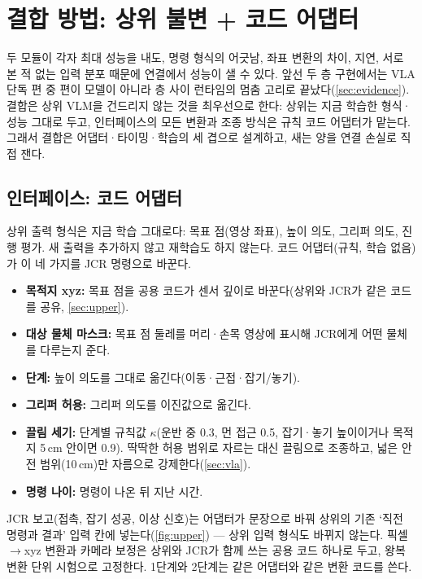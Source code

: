 \section{결합 방법: 상위 불변 + 코드 어댑터}
\label{sec:coupling}

두 모듈이 각자 최대 성능을 내도, 명령 형식의 어긋남, 좌표 변환의 차이, 지연, 서로 본 적 없는 입력 분포 때문에 연결에서 성능이 샐 수 있다. 앞선 두 층 구현에서는 VLA 단독 편 중 편이 모델이 아니라 층 사이 런타임의 멈춤 고리로 끝났다(\cref{sec:evidence}). 결합은 상위 VLM을 건드리지 않는 것을 최우선으로 한다: 상위는 지금 학습한 형식·성능 그대로 두고, 인터페이스의 모든 변환과 조종 방식은 규칙 코드 어댑터가 맡는다. 그래서 결합은 어댑터·타이밍·학습의 세 겹으로 설계하고, 새는 양을 연결 손실로 직접 잰다.

\subsection{인터페이스: 코드 어댑터}
\label{sec:adapter}
상위 출력 형식은 지금 학습 그대로다: 목표 점(영상 좌표), 높이 의도, 그리퍼 의도, 진행 평가. 새 출력을 추가하지 않고 재학습도 하지 않는다. 코드 어댑터(규칙, 학습 없음)가 이 네 가지를 JCR 명령으로 바꾼다.
\begin{itemize}
  \item \textbf{목적지 xyz:} 목표 점을 공용 코드가 센서 깊이로 바꾼다(상위와 JCR가 같은 코드를 공유, \cref{sec:upper}).
  \item \textbf{대상 물체 마스크:} 목표 점 둘레를 머리·손목 영상에 표시해 JCR에게 어떤 물체를 다루는지 준다.
  \item \textbf{단계:} 높이 의도를 그대로 옮긴다(이동·근접·잡기/놓기).
  \item \textbf{그리퍼 허용:} 그리퍼 의도를 이진값으로 옮긴다.
  \item \textbf{끌림 세기:} 단계별 규칙값 $\kappa$(운반 중 0.3, 먼 접근 0.5, 잡기·놓기 높이이거나 목적지 5\,cm 안이면 0.9). 딱딱한 허용 범위로 자르는 대신 끌림으로 조종하고, 넓은 안전 범위(10\,cm)만 자름으로 강제한다(\cref{sec:vla}).
  \item \textbf{명령 나이:} 명령이 나온 뒤 지난 시간.
\end{itemize}
JCR 보고(접촉, 잡기 성공, 이상 신호)는 어댑터가 문장으로 바꿔 상위의 기존 `직전 명령과 결과' 입력 칸에 넣는다(\cref{fig:upper}) — 상위 입력 형식도 바뀌지 않는다. 픽셀$\rightarrow$xyz 변환과 카메라 보정은 상위와 JCR가 함께 쓰는 공용 코드 하나로 두고, 왕복 변환 단위 시험으로 고정한다. 1단계와 2단계는 같은 어댑터와 같은 변환 코드를 쓴다.

